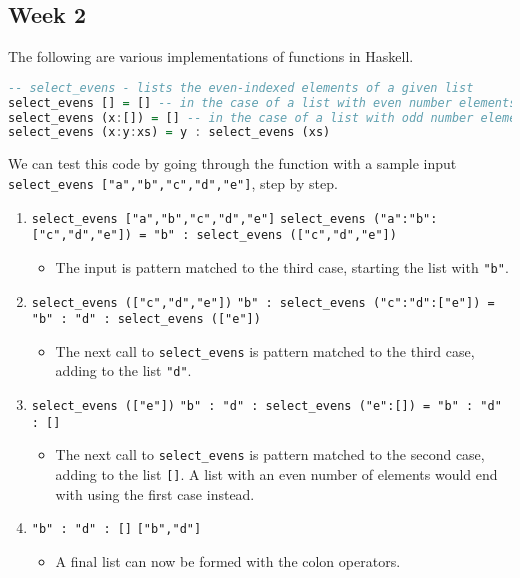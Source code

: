 \documentclass{article}
\theoremstyle{theorem}
\theoremstyle{definition}
\theoremstyle{remark}
\begin{document}
\subsection{Week 2}

The following are various implementations of functions in Haskell.
 
\begin{lstlisting}[language=Haskell]
-- select_evens - lists the even-indexed elements of a given list
select_evens [] = [] -- in the case of a list with even number elements
select_evens (x:[]) = [] -- in the case of a list with odd number elements
select_evens (x:y:xs) = y : select_evens (xs)
\end{lstlisting}

\noindent We can test this code by going through the function with a sample input \texttt{select\_evens ["a","b","c","d","e"]}, step by step.

\begin{enumerate}[noitemsep]
  \item \texttt{select\_evens ["a","b","c","d","e"]}
  \linebreak \texttt{select\_evens ("a":"b":["c","d","e"]) = "b" : select\_evens (["c","d","e"])}
  \begin{itemize}
      \item The input is pattern matched to the third case, starting the list with \texttt{"b"}.
  \end{itemize} 
  \item \texttt{select\_evens (["c","d","e"])}
  \linebreak \texttt{"b" : select\_evens ("c":"d":["e"]) = "b" : "d" : select\_evens (["e"])}
  \begin{itemize}
      \item The next call to \texttt{select\_evens} is pattern matched to the third case, adding to the list \texttt{"d"}.
  \end{itemize} 
  \item \texttt{select\_evens (["e"])}
  \linebreak \texttt{"b" : "d" : select\_evens ("e":[]) = "b" : "d" : []}
  \begin{itemize}
      \item The next call to \texttt{select\_evens} is pattern matched to the second case, adding to the list \texttt{[]}. A list with an even number of elements would end with using the first case instead.
  \end{itemize}
  \item \texttt{"b" : "d" : []}
  \linebreak \texttt{["b","d"]}
  \begin{itemize}
      \item A final list can now be formed with the colon operators.
  \end{itemize} 
\end{enumerate}
\end{document}
